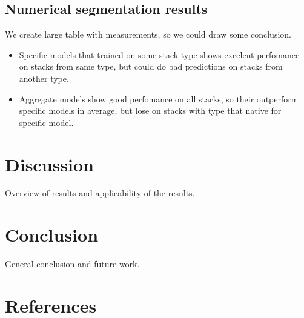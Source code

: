 \documentclass[review]{elsarticle}
\begin{document}
\subsection{Numerical segmentation results}

We create large table with measurements, so we could draw some conclusion. 

\begin{itemize}
	\item Specific models that trained on some stack type shows excelent perfomance on stacks from same type, but could do bad predictions on stacks from another type.
	\item Aggregate models show good perfomance on all stacks, so 
their outperform specific models in average, but lose on stacks with type that native for specific model.
\end{itemize}


\section{Discussion}
Overview of results and applicability of the results.

\section{Conclusion}
General conclusion and future work.

\section*{References}


\end{document}
